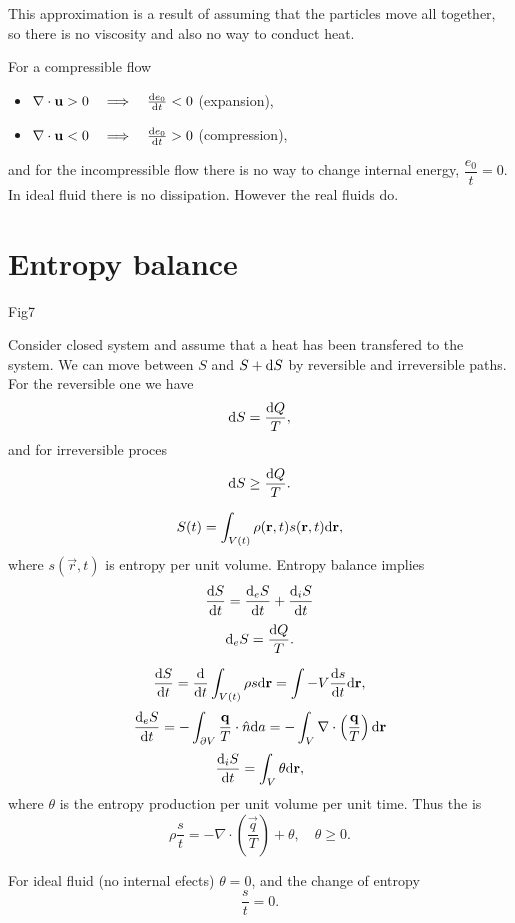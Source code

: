 \documentclass[11pt,oneside]{book}
\theoremstyle{definition} %
\theoremstyle{plain} %
\theoremstyle{remark} %
\theoremstyle{underline}
\begin{document}
  This approximation is a result of assuming that the particles move all together, so there is no viscosity and also no way to conduct heat.
  
  For a compressible flow
  \begin{itemize}
    \item $\nabla \cdot \mathbf{u} > 0 \quad \Longrightarrow \quad \frac{\mathrm{d} e_0}{\mathrm{d} t} < 0 $ (expansion),
    \item $\nabla \cdot \mathbf{u} < 0 \quad \Longrightarrow \quad \frac{\mathrm{d} e_0}{\mathrm{d} t} > 0 $ (compression),
  \end{itemize}
  and for the incompressible flow there is no way to change internal energy, $\dfrac{e_0}{t} = 0$.
  In ideal fluid there is no dissipation.
  However the real fluids do.

  \section{Entropy balance} 
  
  \todo Fig7

  Consider closed system and assume that a heat has been transfered to the system.
  We can move between $S$ and $S + \mathrm{d} S$ by reversible and irreversible paths.
  For the reversible one we have 
  \begin{displaymath}
    \mathrm{d} S  = \frac{\mathrm{d} Q}{T},
  \end{displaymath}
  and for irreversible proces
  \begin{displaymath}
    \mathrm{d} S \geq \frac{\mathrm{d} Q}{T}.
  \end{displaymath}
  
  \begin{displaymath}
    S(t) = \int_{V(t)} \rho( \mathbf{r} , t) s( \mathbf{r}, t) \mathrm{d} \mathbf{r},
  \end{displaymath}
  where $s(\vec r, t)$ is entropy per unit volume.
  Entropy balance implies
  \begin{displaymath}
    \frac{\mathrm{d} S}{\mathrm{d} t} = \frac{\mathrm{d}_e S}{\mathrm{d} t} + \frac{\mathrm{d}_i S}{\mathrm{d} t} 
  \end{displaymath}
  \begin{displaymath}
    \mathrm{d}_e S = \frac{\mathrm{d} Q}{T}.
  \end{displaymath}
  
  \begin{displaymath}
    \frac{\mathrm{d} S}{\mathrm{d} t} = \frac{\mathrm{d} }{\mathrm{d} t} \int_{V(t)} \rho s \mathrm{d} \mathbf{r} = \int-V \frac{\mathrm{d} s}{\mathrm{d} t} \mathrm{d} \mathbf{r},
  \end{displaymath}
  \begin{displaymath}
    \frac{\mathrm{d} _e S}{\mathrm{d} t} = - \int_{\partial V} \frac{ \mathbf{q}}{T} \cdot \hat n \mathrm{d} a 
    = - \int_V \nabla \cdot \left( \frac{\mathbf{q}}{T} \right) \mathrm{d} \mathbf{r}
  \end{displaymath}
  \begin{displaymath}
    \frac{\mathrm{d} _i S}{\mathrm{d} t} = \int_V \theta \mathrm{d} \mathbf{r},
  \end{displaymath}
  where $\theta$ is the entropy production per unit volume per unit time.
  Thus the  is
  \begin{displaymath}
    \rho \dfrac{s}{t} = - \nabla \cdot \left( \frac{\vec q }{T}  \right) + \theta, \quad \theta \geq 0.
  \end{displaymath}

  For ideal fluid (no internal efects) $\theta = 0$, and the change of entropy
  \begin{displaymath}
    \dfrac{s}{t} = 0.
  \end{displaymath}
\end{document}
